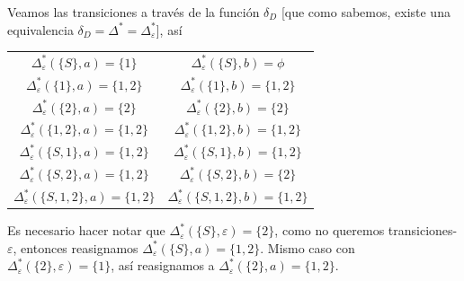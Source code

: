 \documentclass{article}
\begin{document}
\begin{enumerate}
  Veamos las transiciones a través de la función $\delta_{D}$ [que como sabemos,
    existe una equivalencia $\delta_{D} = \Delta^{*} = \Delta^{*}_{\varepsilon}$], así
  \begin{center}
    \begin{tabular}{ c  c }
      $\Delta^{*}_{\varepsilon}\left(\{S\}, a\right) = \{1\}$
      & $\Delta^{*}_{\varepsilon}\left(\{S\}, b\right) = \phi$\\
      $\Delta^{*}_{\varepsilon}\left(\{1\}, a\right) = \{1,2\}$
      & $\Delta^{*}_{\varepsilon}\left(\{1\}, b\right) = \{1,2\}$ \\
      $\Delta^{*}_{\varepsilon}\left(\{2\}, a\right) = \{2\}$
      & $\Delta^{*}_{\varepsilon}\left(\{2\}, b\right) = \{2\}$\\
      $\Delta^{*}_{\varepsilon}\left(\{1,2\}, a\right) = \{1,2\}$
      & $\Delta^{*}_{\varepsilon}\left(\{1,2\}, b\right) = \{1,2\}$ \\
      $\Delta^{*}_{\varepsilon}\left(\{S,1\}, a\right) = \{1,2\}$
      & $\Delta^{*}_{\varepsilon}\left(\{S,1\}, b\right) = \{1,2\}$ \\
      $\Delta^{*}_{\varepsilon}\left(\{S,2\}, a\right) = \{1,2\}$
      & $\Delta^{*}_{\varepsilon}\left(\{S,2\}, b\right) = \{2\}$ \\
      $\Delta^{*}_{\varepsilon}\left(\{S,1,2\}, a\right) = \{1,2\}$
      & $\Delta^{*}_{\varepsilon}\left(\{S,1,2\}, b\right) = \{1,2\}$\\
    \end{tabular} 
  \end{center}
  Es necesario hacer notar que $\Delta^{*}_{\varepsilon}\left(\{S\}, \varepsilon\right) = \{2\}$,
  como no queremos transiciones-$\varepsilon$, entonces reasignamos
  $\Delta^{*}_{\varepsilon}\left(\{S\}, a\right) = \{1,2\}$. Mismo caso con
  $\Delta^{*}_{\varepsilon}\left(\{2\}, \varepsilon\right) = \{1\}$, así reasignamos a
  $\Delta^{*}_{\varepsilon}\left(\{2\}, a\right) = \{1,2\}$.
  

\end{enumerate}
\end{document}
